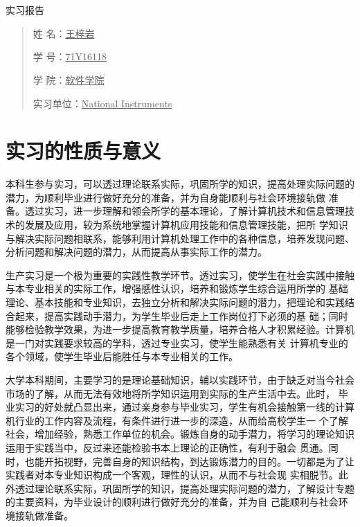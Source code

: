 \documentclass[UTF8]{ctexart}
\begin{document}
\nocite{*}%

	\begin{center}
		\quad \\
		\quad \\
		\vskip 3.5cm
		\heiti \fontsize{45}{17} 实习报告
		\vskip 3.5cm
	\end{center}
	\vskip 3.5cm
	\begin{quotation}
		\heiti \fontsize{36}{17}
		\doublespacing
		\par\setlength\parindent{12em}
		\quad 
		\heiti		
		
		姓\hspace{0.61cm} 名：\underline{王梓岩}
		
		学\hspace{0.61cm} 号：\underline{71Y16118}

		学\hspace{0.61cm} 院：\underline{软件学院}
		
		实习单位：\underline{National Instruments}
		
		\vskip 2cm
		\centering
	\end{quotation}
	
\newpage
\songti \fontsize{13}{13}
\large
\section{实习的性质与意义}
本科生参与实习，可以透过理论联系实际，巩固所学的知识，提高处理实际问题的潜力，为顺利毕业进行做好充分的准备，并为自身能顺利与社会环境接轨做
准备。透过实习，进一步理解和领会所学的基本理论，了解计算机技术和信息管理技术的发展及应用，较为系统地掌握计算机应用技能和信息管理技能，把所
学知识与解决实际问题相联系，能够利用计算机处理工作中的各种信息，培养发现问题、分析问题和解决问题的潜力，从而提高从事实际工作的潜力。
\par
生产实习是一个极为重要的实践性教学环节。透过实习，使学生在社会实践中接触与本专业相关的实际工作，增强感性认识，培养和锻炼学生综合运用所学的
基础理论、基本技能和专业知识，去独立分析和解决实际问题的潜力，把理论和实践结合起来，提高实践动手潜力，为学生毕业后走上工作岗位打下必须的基
础；同时能够检验教学效果，为进一步提高教育教学质量，培养合格人才积累经验。计算机是一门对实践要求较高的学科，透过专业实习，使学生能熟悉有关
计算机专业的各个领域，使学生毕业后能胜任与本专业相关的工作。
\par
大学本科期间，主要学习的是理论基础知识，辅以实践环节，由于缺乏对当今社会市场的了解，从而无法有效地将所学知识运用到实际的生产生活中去。此时，
毕业实习的好处就凸显出来，通过亲身参与毕业实习，学生有机会接触第一线的计算机行业的工作内容及流程，有条件进行进一步的深造，从而给高校学生一
个了解社会，增加经验，熟悉工作单位的机会。锻炼自身的动手潜力，将学习的理论知识运用于实践当中，反过来还能检验书本上理论的正确性，有利于融会
贯通。同时，也能开拓视野，完善自身的知识结构，到达锻炼潜力的目的。一切都是为了让实践者对本专业知识构成一个客观，理性的认识，从而不与社会现
实相脱节。此外透过理论联系实际，巩固所学的知识，提高处理实际问题的潜力，了解设计专题的主要资料，为毕业设计的顺利进行做好充分的准备，并为自
己能顺利与社会环境接轨做准备。
\end{document}
